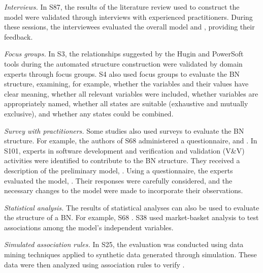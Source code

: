 \textit{Interviews.} In S87, the results of the literature review used to construct the model were validated through interviews with experienced practitioners. During these sessions, the interviewees evaluated the overall model and , providing their feedback.

\textit{Focus groups.} In S3, the relationships suggested by the Hugin and PowerSoft tools during the automated structure construction were validated by domain experts through focus groups. S4 also used focus groups to evaluate the BN structure, examining, for example, whether the variables and their values have clear meaning, whether all relevant variables were included, whether variables are appropriately named, whether all states are suitable (exhaustive and mutually exclusive), and whether any states could be combined.

\textit{Survey with practitioners.} Some studies also used surveys to evaluate the BN structure. For example, the authors of S68 administered a questionnaire, and . In S101, experts in software development and verification and validation (V\&V) activities were identified to contribute to the BN structure. They received a description of the preliminary model, . Using a questionnaire, the experts evaluated the model, . Their responses were carefully considered, and the necessary changes to the model were made to incorporate their observations.

\textit{Statistical analysis.} The results of statistical analyses can also be used to evaluate the structure of a BN. For example, S68 . S38 used market-basket analysis to test associations among the model's independent variables.

\textit{Simulated association rules.} In S25, the evaluation was conducted using data mining techniques applied to synthetic data generated through simulation. These data were then analyzed using association rules to verify .

